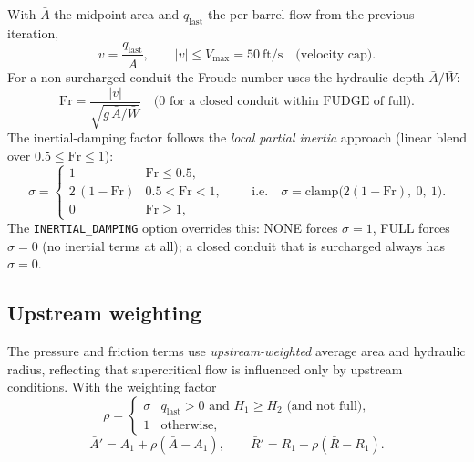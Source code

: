 \documentclass[11pt,a4paper]{article}
\newcommand{\st}{\mathrm{s}}
\newcommand{\ft}{\mathrm{ft}}
\begin{document}
With $\bar A$ the midpoint area and $q_{\mathrm{last}}$ the per-barrel flow
from the previous iteration,
\begin{equation}
  v = \frac{q_{\mathrm{last}}}{\bar A}, \qquad
  \lvert v \rvert \le V_{\max} = 50\ \ft/\st
  \quad\text{(velocity cap).}
\end{equation}
For a non-surcharged conduit the Froude number uses the hydraulic depth
$\bar A/\bar W$:
\begin{equation}
  \mathrm{Fr} = \frac{\lvert v \rvert}{\sqrt{g\,\bar A / \bar W}}
  \quad\text{(0 for a closed conduit within FUDGE of full).}
\end{equation}
The inertial-damping factor follows the \emph{local partial inertia} approach
(linear blend over $0.5 \le \mathrm{Fr} \le 1$):
\begin{equation}
  \sigma =
  \begin{cases}
    1 & \mathrm{Fr} \le 0.5,\\
    2\,(1 - \mathrm{Fr}) & 0.5 < \mathrm{Fr} < 1,\\
    0 & \mathrm{Fr} \ge 1,
  \end{cases}
  \qquad\text{i.e.}\quad
  \sigma = \mathrm{clamp}\!\big(2(1-\mathrm{Fr}),\ 0,\ 1\big).
\end{equation}
The \texttt{INERTIAL\_DAMPING} option overrides this: NONE forces $\sigma = 1$,
FULL forces $\sigma = 0$ (no inertial terms at all); a closed conduit that is
surcharged always has $\sigma = 0$.

\subsection{Upstream weighting}

The pressure and friction terms use \emph{upstream-weighted} average area and
hydraulic radius, reflecting that supercritical flow is influenced only by
upstream conditions. With the weighting factor
\begin{equation}
  \rho = \begin{cases} \sigma & q_{\mathrm{last}} > 0 \text{ and } H_1 \ge H_2
    \text{ (and not full),}\\ 1 & \text{otherwise,}\end{cases}
\end{equation}
\begin{equation}
  \bar A' = A_1 + \rho\left(\bar A - A_1\right),
  \qquad
  \bar R' = R_1 + \rho\left(\bar R - R_1\right).
\end{equation}
\end{document}
